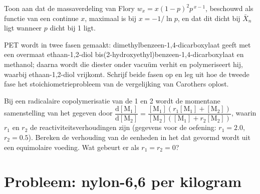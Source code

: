 \begin{exercise}[$\star\star\star$]\label{exo:b2:polymer-synthesis:10}
Toon aan dat de massaverdeling van Flory $w_x = x(1-p)^2p^{\,x-1}$, beschouwd als functie van een continue
$x$, maximaal is bij $x = -1/\ln p$, en dat dit dicht bij $\bar X_n$ ligt wanneer $p$ dicht bij 1 ligt.
\end{exercise}

\begin{exercise}[$\star\star\star$]\label{exo:b2:polymer-synthesis:11}
PET wordt in twee fasen gemaakt: dimethylbenzeen-1,4-dicarboxylaat geeft met een overmaat ethaan-1,2-diol
bis(2-hydroxyethyl)benzeen-1,4-dicarboxylaat en methanol; daarna wordt die diester onder vacuüm verhit
en polymeriseert hij, waarbij ethaan-1,2-diol vrijkomt. Schrijf beide fasen op en leg uit hoe de tweede fase
het stoichiometrieprobleem van de vergelijking van Carothers oplost.
\end{exercise}

\begin{exercise}[$\star\star\star$]\label{exo:b2:polymer-synthesis:12}
Bij een radicalaire copolymerisatie van de  1 en 2 wordt de momentane samenstelling van het 
gegeven door $\dfrac{\mathrm d[\mathrm M_1]}{\mathrm d[\mathrm M_2]} = \dfrac{[\mathrm M_1](r_1[\mathrm M_1]
+ [\mathrm M_2])}{[\mathrm M_2]([\mathrm M_1] + r_2[\mathrm M_2])}$, waarin $r_1$ en $r_2$ de
reactiviteitsverhoudingen zijn (gegevens voor de oefening: $r_1 = 2.0$, $r_2 = 0.5$). Bereken de verhouding van de eenheden in het
 dat gevormd wordt uit een equimolaire voeding. Wat gebeurt er als $r_1 = r_2 = 0$?
\end{exercise}

\section{Probleem: nylon-6,6 per kilogram}

